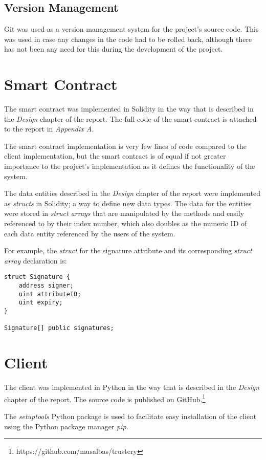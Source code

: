 \documentclass[12pt,a4paper]{report}
\begin{document}
	\subsection{Version Management}
	Git was used as a version management system for the project's source code. This was used in case any changes in the code had to be rolled back, although there has not been any need for this during the development of the project.
	
	\section{Smart Contract}
	The smart contract was implemented in Solidity in the way that is described in the \textit{Design} chapter of the report. The full code of the smart contract is attached to the report in \textit{Appendix A}.
	
	The smart contract implementation is very few lines of code compared to the client implementation, but the smart contract is of equal if not greater importance to the project's implementation as it defines the functionality of the system.
	
	The data entities described in the \textit{Design} chapter of the report were implemented as \textit{structs} in Solidity; a way to define new data types.\cite{13} The data for the entities were stored in \textit{struct arrays} that are manipulated by the methods and easily referenced to by their index number, which also doubles as the numeric ID of each data entity referenced by the users of the system.
	
	For example, the \textit{struct} for the signature attribute and its corresponding \textit{struct array} declaration is:
	\begin{lstlisting}
struct Signature {
    address signer;
    uint attributeID;
    uint expiry;
}

Signature[] public signatures;
	\end{lstlisting}
	
	\section{Client}
	The client was implemented in Python in the way that is described in the \textit{Design} chapter of the report. The source code is published on GitHub.\footnote{https://github.com/musalbas/trustery}
	
	The \textit{setuptools} Python package is used to facilitate easy installation of the client using the Python package manager \textit{pip}.
	
\end{document}
